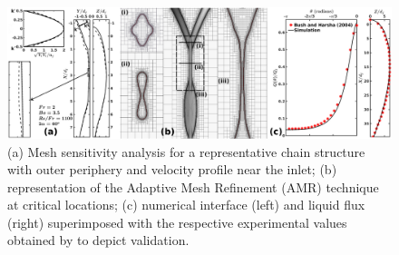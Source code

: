 \documentclass{jfm}
\begin{document}
\begin{figure}
	\centering
	\includegraphics[width=\linewidth]{Figure2}
	\caption{(a) Mesh sensitivity analysis for a representative chain structure with outer periphery and velocity profile near the inlet; (b) representation of the Adaptive Mesh Refinement (AMR) technique at critical locations; (c) numerical interface (left) and liquid flux (right) superimposed with the respective experimental values obtained by \cite{bush2004collision} to depict validation.}
	\label{Figure::gisetal}
\end{figure}
\end{document}
